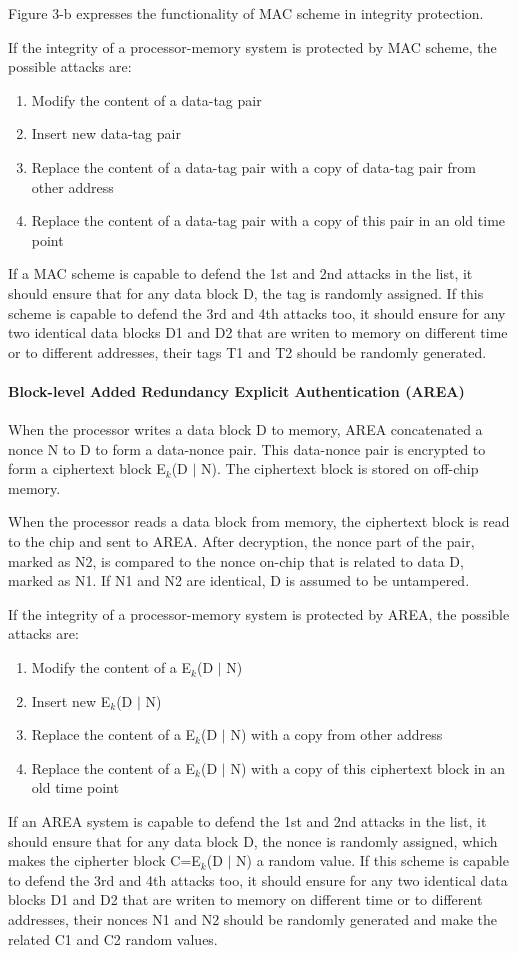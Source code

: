 \documentclass{article}
\begin{document}
Figure 3-b expresses the functionality of MAC scheme in integrity protection.

If the integrity of a processor-memory system is protected by MAC scheme, the possible attacks are:
\begin{enumerate}
	\item Modify the content of a data-tag pair
	\item Insert new data-tag pair
	\item Replace the content of a data-tag pair with a copy of data-tag pair from other address
	\item Replace the content of a data-tag pair with a copy of this pair in an old time point
\end{enumerate}
If a MAC scheme is capable to defend the 1st and 2nd attacks in the list, it should ensure that for any data block D, the tag is randomly assigned. If this scheme is capable to defend the 3rd and 4th attacks too, it should ensure for any two identical data blocks D1 and D2 that are writen to memory on different time or to different addresses, their tags T1 and T2 should be randomly generated.

\paragraph{Block-level  Added Redundancy Explicit Authentication (AREA)}
When the processor writes a data block D to memory, AREA concatenated a nonce N to D to form a data-nonce pair. This data-nonce pair is encrypted to form a ciphertext block E$_k$(D $\mid$ N). The ciphertext block is stored on off-chip memory.

When the processor reads a data block from memory, the ciphertext block is read to the chip and sent to AREA. After decryption, the nonce part of the pair, marked as N2, is compared to the nonce on-chip that is related to data D, marked as N1. If N1 and N2 are identical, D is assumed to be untampered.

If the integrity of a processor-memory system is protected by AREA, the possible attacks are:
\begin{enumerate}
	\item Modify the content of a E$_k$(D $\mid$ N)
	\item Insert new E$_k$(D $\mid$ N)
	\item Replace the content of a E$_k$(D $\mid$ N) with a copy from other address
	\item Replace the content of a E$_k$(D $\mid$ N) with a copy of this ciphertext block in an old time point
\end{enumerate}
If an AREA system is capable to defend the 1st and 2nd attacks in the list, it should ensure that for any data block D, the nonce is randomly assigned, which makes the cipherter block C=E$_k$(D $\mid$ N) a random value. If this scheme is capable to defend the 3rd and 4th attacks too, it should ensure for any two identical data blocks D1 and D2 that are writen to memory on different time or to different addresses, their nonces N1 and N2 should be randomly generated and make the related C1 and C2 random values.
\end{document}

